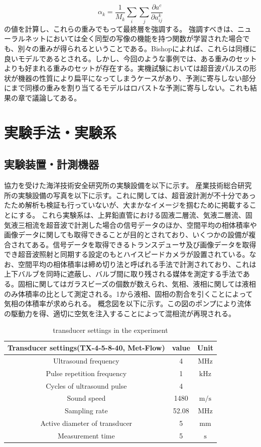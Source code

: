 \documentclass[uplatex]{suribt}
\begin{document}
\begin{equation}
    \alpha_k=\frac{1}{M_k}\sum_i\sum_j{\frac{\partial a^c}{\partial a_{ij}^k}}
\end{equation}
の値を計算し、これらの重みでもって最終層を強調する。
強調すべきは、ニューラルネットにおいては全く同型の写像の機能を持つ関数が学習された場合でも、別々の重みが得られるということである。Bishop\cite{PRML}によれば、これらは同様に良いモデルであるとされる。しかし、今回のような事例では、ある重みのセットよりも好まれる重みのセットが存在する。実機試験においては超音波パルスの形状が機器の性質により扁平になってしまうケースがあり、予測に寄与しない部分にまで同様の重みを割り当てるモデルはロバストな予測に寄与しない。これも結果の章で議論してある。
\chapter{実験手法・実験系}
\section{実験装置・計測機器}
協力を受けた海洋技術安全研究所の実験設備を以下に示す。
産業技術総合研究所の実験設備の写真を以下に示す。これに関しては、超音波計測が不十分であったため解析も検証も行っていないが、大まかなイメージを掴むために掲載することにする。
これら実験系は、上昇鉛直管における固液二層流、気液二層流、固気液三相流を超音波で計測した場合の信号データのほか、空間平均の相体積率や画像データに関しても取得できることが目的とされており、いくつかの設備が複合されてある。信号データを取得できるトランスデューサ及び画像データを取得でき超音波照射と同期する設定のもとハイスピードカメラが設置されている。なお、空間平均の相体積率は締め切り法と呼ばれる手法で計測されており、これは上下バルブを同時に遮蔽し、バルブ間に取り残される媒体を測定する手法である。固相に関してはガラスビーズの個数が数えられ、気相、液相に関しては液相のみ体積率の比として測定される。1から液相、固相の割合を引くことによって気相の体積率が求められる。
概念図を以下に示す。この図のポンプにより流体の駆動力を得、適切に空気を注入することによって混相流が再現される。
\begin{table}[]
    \centering
    \begin{tabular}{ccc}
    \hline
         Transducer settings(TX-4-5-8-40, Met-Flow) & value & Unit  \\
         \hline
         Ultrasound frequency &  4 & $\mathrm{MHz}$\\
         Pulse repetition frequency & 1 & $\mathrm{kHz}$\\
         Cycles of ultrasound pulse & 4 & \\
         Sound speed & 1480 & $\mathrm{m/s}$\\
         Sampling rate & 52.08 & $\mathrm{MHz}$ \\
         Active diameter of transducer & 5 & $\mathrm{mm}$\\
         Measurement time & 5 & $\mathrm{s}$\\
    \hline
    \end{tabular}
    \caption{transducer settings in the experiment}
    \label{tab:transducer_settings}
\end{table}
\end{document}
